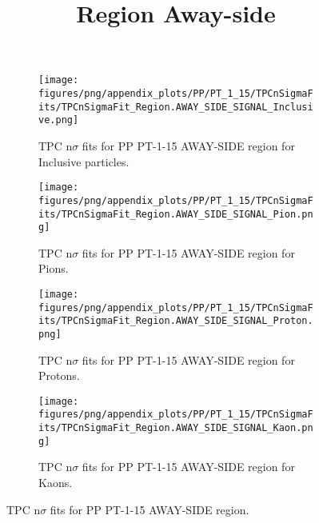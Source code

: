             \begin{figure}[H]
                \title{Region Away-side}
                \begin{subfigure}[b]{0.5\textwidth}
                    \centering
                    \texttt{[image: figures/png/appendix\_plots/PP/PT\_1\_15/TPCnSigmaFits/TPCnSigmaFit\_Region.AWAY\_SIDE\_SIGNAL\_Inclusive.png]}
                    \caption{TPC n$\sigma$ fits for PP PT-1-15 AWAY-SIDE region for Inclusive particles.}
                    \label{fig:appendix_PP_PT-1-15_AWAY_SIDE_SIGNAL_Inclusive}
                \end{subfigure}
                \begin{subfigure}[b]{0.5\textwidth}
                    \centering
                    \texttt{[image: figures/png/appendix\_plots/PP/PT\_1\_15/TPCnSigmaFits/TPCnSigmaFit\_Region.AWAY\_SIDE\_SIGNAL\_Pion.png]}
                    \caption{TPC n$\sigma$ fits for PP PT-1-15 AWAY-SIDE region for Pions.}
                    \label{fig:appendix_PP_PT-1-15_AWAY_SIDE_SIGNAL_Pion}
                \end{subfigure}
                \begin{subfigure}[b]{0.5\textwidth}
                    \centering
                    \texttt{[image: figures/png/appendix\_plots/PP/PT\_1\_15/TPCnSigmaFits/TPCnSigmaFit\_Region.AWAY\_SIDE\_SIGNAL\_Proton.png]}
                    \caption{TPC n$\sigma$ fits for PP PT-1-15 AWAY-SIDE region for Protons.}
                    \label{fig:appendix_PP_PT-1-15_AWAY_SIDE_SIGNAL_Proton}
                \end{subfigure}
                \begin{subfigure}[b]{0.5\textwidth}
                    \centering
                    \texttt{[image: figures/png/appendix\_plots/PP/PT\_1\_15/TPCnSigmaFits/TPCnSigmaFit\_Region.AWAY\_SIDE\_SIGNAL\_Kaon.png]}
                    \caption{TPC n$\sigma$ fits for PP PT-1-15 AWAY-SIDE region for Kaons.}
                    \label{fig:appendix_PP_PT-1-15_AWAY_SIDE_SIGNAL_Kaon}
                \end{subfigure}
                \caption{TPC n$\sigma$ fits for PP PT-1-15 AWAY-SIDE region.}
                \label{fig:appendix_PP_PT-1-15_AWAY_SIDE_SIGNAL}
            \end{figure}

